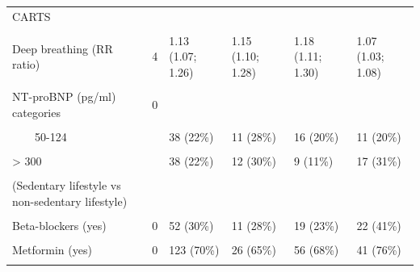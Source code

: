 \documentclass[
  letterpaper,
  headsepline=true,
  open=any]{scrbook}
\begin{document}
\begin{landscape}
\begin{table}
{\begin{tabular}[t]{llllll}
CARTS &  &  &  &  & \\
\cellcolor{gray!6}{Lying to standing (RR ratio)} & \cellcolor{gray!6}{8} & \cellcolor{gray!6}{1.02 (1.01; 1.06)} & \cellcolor{gray!6}{1.03 (1.02; 1.05)} & \cellcolor{gray!6}{1.05 (1.01; 1.08)} & \cellcolor{gray!6}{1.01 (1.00; 1.02)}\\
Deep breathing (RR ratio) & 4 & 1.13 (1.07; 1.26) & 1.15 (1.10; 1.28) & 1.18 (1.11; 1.30) & 1.07 (1.03; 1.08)\\
\cellcolor{gray!6}{Valsalva maneuver (RR ratio)} & \cellcolor{gray!6}{45} & \cellcolor{gray!6}{1.24 (1.13; 1.36)} & \cellcolor{gray!6}{1.20 (1.14; 1.25)} & \cellcolor{gray!6}{1.32 (1.25; 1.45)} & \cellcolor{gray!6}{1.11 (1.08; 1.16)}\\
\addlinespace
NT-proBNP (pg/ml) categories & 0 &  &  &  & \\
\cellcolor{gray!6}{    < 50} & \cellcolor{gray!6}{} & \cellcolor{gray!6}{72 (41\%)} & \cellcolor{gray!6}{10 (25\%)} & \cellcolor{gray!6}{47 (57\%)} & \cellcolor{gray!6}{15 (28\%)}\\
    50-124 &  & 38 (22\%) & 11 (28\%) & 16 (20\%) & 11 (20\%)\\
\cellcolor{gray!6}{125-300} & \cellcolor{gray!6}{} & \cellcolor{gray!6}{28 (16\%)} & \cellcolor{gray!6}{7 (18\%)} & \cellcolor{gray!6}{10 (12\%)} & \cellcolor{gray!6}{11 (20\%)}\\
> 300 &  & 38 (22\%) & 12 (30\%) & 9 (11\%) & 17 (31\%)\\
\addlinespace
\cellcolor{gray!6}{Leisure physical activity} & \cellcolor{gray!6}{15} & \cellcolor{gray!6}{68 (42\%)} & \cellcolor{gray!6}{17 (50\%)} & \cellcolor{gray!6}{27 (36\%)} & \cellcolor{gray!6}{24 (45\%)}\\
(Sedentary lifestyle vs non-sedentary lifestyle) &  &  &  &  & \\
\cellcolor{gray!6}{Any antihypertensive medication (yes)} & \cellcolor{gray!6}{0} & \cellcolor{gray!6}{140 (80\%)} & \cellcolor{gray!6}{33 (83\%)} & \cellcolor{gray!6}{61 (74\%)} & \cellcolor{gray!6}{46 (85\%)}\\
Beta-blockers (yes) & 0 & 52 (30\%) & 11 (28\%) & 19 (23\%) & 22 (41\%)\\
\cellcolor{gray!6}{Glucose-lowering medication} & \cellcolor{gray!6}{} & \cellcolor{gray!6}{} & \cellcolor{gray!6}{} & \cellcolor{gray!6}{} & \cellcolor{gray!6}{}\\
\addlinespace
Metformin (yes) & 0 & 123 (70\%) & 26 (65\%) & 56 (68\%) & 41 (76\%)\\
\cellcolor{gray!6}{SGLT2-inhibitors (yes)} & \cellcolor{gray!6}{0} & \cellcolor{gray!6}{81 (46\%)} & \cellcolor{gray!6}{12 (30\%)} & \cellcolor{gray!6}{40 (49\%)} & \cellcolor{gray!6}{29 (54\%)}\\

\end{tabular}}
\end{table}
\end{landscape}
\end{document}
